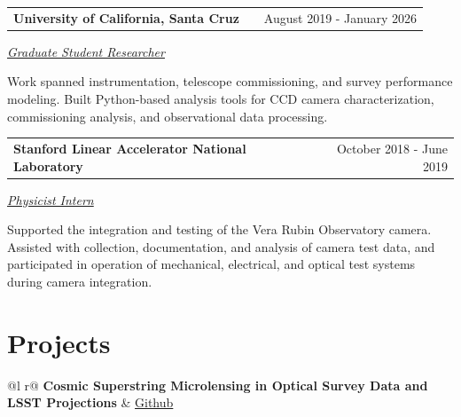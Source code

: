 \documentclass[a4paper,12pt]{article}
\makeatletter
\newenvironment{jobshort}[2]
    {
    \begin{tabularx}{\linewidth}{@{}l X r@{}}
    \textbf{#1} & \hfill &  #2 \\[3.75pt]
    \end{tabularx}
    }
    {
    }
\makeatother
\begin{document}
\begin{jobshort}{University of California, Santa Cruz}{August 2019 - January 2026}
\textit{\underline{Graduate Student Researcher}}

Work spanned instrumentation, telescope commissioning, and survey performance modeling. Built Python-based analysis tools for CCD camera characterization, commissioning analysis, and observational data processing.
\end{jobshort}


\begin{jobshort}{Stanford Linear Accelerator National Laboratory}{October 2018 - June 2019}
\textit{\underline{Physicist Intern}}

Supported the integration and testing of the Vera Rubin Observatory camera. Assisted with collection, documentation, and analysis of camera test data, and participated in operation of mechanical, electrical, and optical test systems during camera integration.
\end{jobshort}
  
\section{Projects}

\begin{tabularx}{\linewidth}{ @{}l r@{} }
\textbf{Cosmic Superstring Microlensing in Optical Survey Data and LSST Projections
} & \hfill \href{https://github.com/adriansh95/StringMicrolensing}{Github} \\[3.75pt]
  \\
\end{tabularx}

\end{document}
